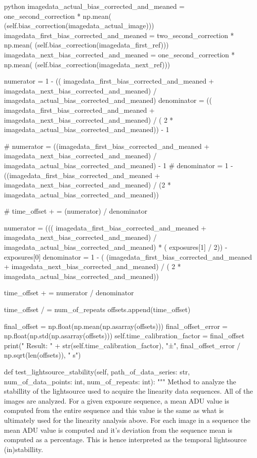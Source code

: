 \documentclass[../main.tex]{subfiles}
\begin{document}
\begin{mintedbox}{python}
imagedata_actual_bias_corrected_and_meaned  =  one_second_correction * np.mean(
(self.bias_correction(imagedata_actual_image)))
imagedata_first_bias_corrected_and_meaned  =  two_second_correction * np.mean(
(self.bias_correction(imagedata_first_ref)))
imagedata_next_bias_corrected_and_meaned  =  one_second_correction * np.mean(
(self.bias_correction(imagedata_next_ref)))

numerator  =  1 - ((
imagedata_first_bias_corrected_and_meaned + imagedata_next_bias_corrected_and_meaned) / imagedata_actual_bias_corrected_and_meaned)
denominator  =  ((
imagedata_first_bias_corrected_and_meaned + imagedata_next_bias_corrected_and_meaned) / (
2 * imagedata_actual_bias_corrected_and_meaned)) - 1

# numerator    =  ((imagedata_first_bias_corrected_and_meaned + imagedata_next_bias_corrected_and_meaned) / imagedata_actual_bias_corrected_and_meaned) - 1
# denominator  =  1 - ((imagedata_first_bias_corrected_and_meaned + imagedata_next_bias_corrected_and_meaned) / (2 * imagedata_actual_bias_corrected_and_meaned))

# time_offset + =  (numerator)    / denominator

numerator  =  (((
imagedata_first_bias_corrected_and_meaned + imagedata_next_bias_corrected_and_meaned) / imagedata_actual_bias_corrected_and_meaned) * (
exposures[1] / 2)) - exposures[0]
denominator  =  1 - (
(imagedata_first_bias_corrected_and_meaned + imagedata_next_bias_corrected_and_meaned) / (
2 * imagedata_actual_bias_corrected_and_meaned))

time_offset + =  numerator / denominator

time_offset / =  num_of_repeats
offsets.append(time_offset)

final_offset  =  np.float(np.mean(np.asarray(offsets)))
final_offset_error  =  np.float(np.std(np.asarray(offsets)))
self.time_calibration_factor  =  final_offset
print("  Result: " + str(self.time_calibration_factor), "±", final_offset_error / np.sqrt(len(offsets)), " s")

def test_lightsource_stability(self, path_of_data_series: str, num_of_data_points: int, num_of_repeats: int):
"""
Method to analyze the stabillity of the lightsource used to acquire the
linearity data sequences. All of the images are analyzed. For a given
exposure sequence, a mean ADU value is computed from the entire sequence
and this value is the same as what is ultimately used for the linearity
analysis above. For each image in a sequence the mean ADU value is computed
and it's deviation from the sequence mean is computed as a percentage.
This is hence interpreted as the temporal lightsource (in)stabillity.


\end{mintedbox}
\end{document}
